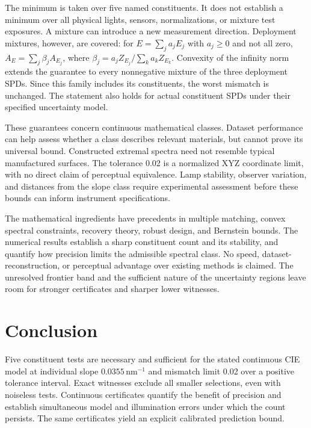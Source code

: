\documentclass{optica-article}
\begin{document}
The minimum is taken over five named constituents. It does not establish a minimum over all physical lights, sensors, normalizations, or mixture test exposures. A mixture can introduce a new measurement direction. Deployment mixtures, however, are covered: for $E=\sum_j a_jE_j$ with $a_j\geq0$ and not all zero,
$A_E=\sum_j\beta_j A_{E_j}$, where $\beta_j=a_jZ_{E_j}/\sum_k a_kZ_{E_k}$.
Convexity of the infinity norm extends the guarantee to every nonnegative mixture of the three deployment SPDs. Since this family includes its constituents, the worst mismatch is unchanged. The statement also holds for actual constituent SPDs under their specified uncertainty model.

These guarantees concern continuous mathematical classes. Dataset performance can help assess whether a class describes relevant materials, but cannot prove its universal bound. Constructed extremal spectra need not resemble typical manufactured surfaces. The tolerance 0.02 is a normalized XYZ coordinate limit, with no direct claim of perceptual equivalence. Lamp stability, observer variation, and distances from the slope class require experimental assessment before these bounds can inform instrument specifications.

The mathematical ingredients have precedents in multiple matching, convex spectral constraints, recovery theory, robust design, and Bernstein bounds. The numerical results establish a sharp constituent count and its stability, and quantify how precision limits the admissible spectral class. No speed, dataset-reconstruction, or perceptual advantage over existing methods is claimed. The unresolved frontier band and the sufficient nature of the uncertainty regions leave room for stronger certificates and sharper lower witnesses.

\section{Conclusion}
Five constituent tests are necessary and sufficient for the stated continuous CIE model at individual slope $0.0355\,\mathrm{nm}^{-1}$ and mismatch limit 0.02 over a positive tolerance interval. Exact witnesses exclude all smaller selections, even with noiseless tests. Continuous certificates quantify the benefit of precision and establish simultaneous model and illumination errors under which the count persists. The same certificates yield an explicit calibrated prediction bound.
\end{document}
